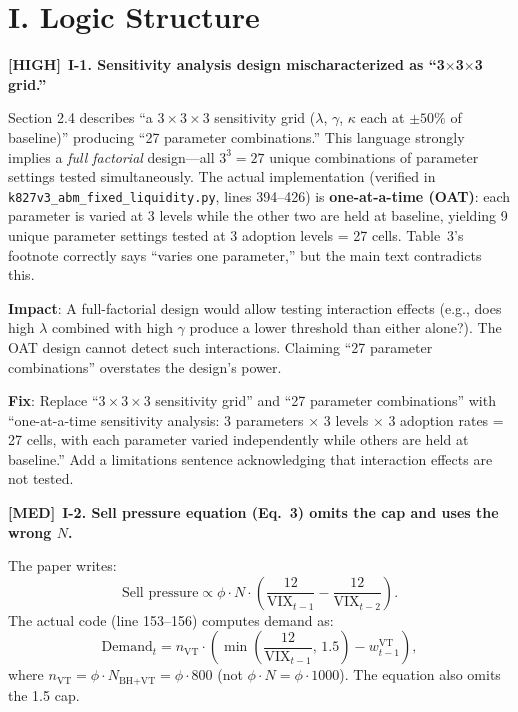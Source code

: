 \documentclass[12pt,a4paper]{article}
\newcommand{\HIGH}{\textbf{\textcolor{errorred}{[HIGH]}}}
\newcommand{\MED}{\textbf{\textcolor{warncolor}{[MED]}}}
\begin{document}
\section*{I. Logic Structure}

\HIGH\ \textbf{I-1. Sensitivity analysis design mischaracterized as ``3$\times$3$\times$3 grid.''}

Section 2.4 describes ``a $3 \times 3 \times 3$ sensitivity grid ($\lambda$, $\gamma$, $\kappa$ each at $\pm 50\%$ of baseline)'' producing ``27 parameter combinations.'' This language strongly implies a \emph{full factorial} design---all $3^3 = 27$ unique combinations of parameter settings tested simultaneously. The actual implementation (verified in \texttt{k827v3\_abm\_fixed\_liquidity.py}, lines 394--426) is \textbf{one-at-a-time (OAT)}: each parameter is varied at 3 levels while the other two are held at baseline, yielding 9 unique parameter settings tested at 3 adoption levels = 27 cells. Table~3's footnote correctly says ``varies one parameter,'' but the main text contradicts this.

\textbf{Impact}: A full-factorial design would allow testing interaction effects (e.g., does high $\lambda$ combined with high $\gamma$ produce a lower threshold than either alone?). The OAT design cannot detect such interactions. Claiming ``27 parameter combinations'' overstates the design's power.

\textbf{Fix}: Replace ``$3 \times 3 \times 3$ sensitivity grid'' and ``27 parameter combinations'' with ``one-at-a-time sensitivity analysis: 3 parameters $\times$ 3 levels $\times$ 3 adoption rates = 27 cells, with each parameter varied independently while others are held at baseline.'' Add a limitations sentence acknowledging that interaction effects are not tested.

\medskip

\MED\ \textbf{I-2. Sell pressure equation (Eq.~3) omits the cap and uses the wrong $N$.}

The paper writes:
\[
\text{Sell pressure} \propto \phi \cdot N \cdot \left(\frac{12}{\text{VIX}_{t-1}} - \frac{12}{\text{VIX}_{t-2}}\right).
\]
The actual code (line 153--156) computes demand as:
\[
\text{Demand}_t = n_{\text{VT}} \cdot \left(\min\!\left(\frac{12}{\text{VIX}_{t-1}},\, 1.5\right) - w_{t-1}^{\text{VT}}\right),
\]
where $n_{\text{VT}} = \phi \cdot N_{\text{BH+VT}} = \phi \cdot 800$ (not $\phi \cdot N = \phi \cdot 1000$). The equation also omits the 1.5 cap.
\end{document}
